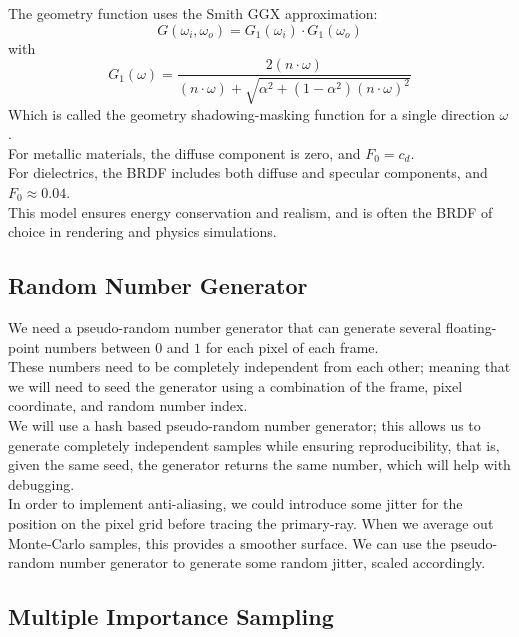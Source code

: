 \documentclass[12pt]{article}
\begin{document}
The geometry function uses the Smith GGX approximation:
\[ G(\omega_i, \omega_o) = 
G_1(\omega_i) \cdot G_1(\omega_o) \]
with
\[ G_1(\omega) = \frac{2 (n \cdot \omega)}
{(n \cdot \omega) + \sqrt{\alpha^2 + (1 - \alpha^2)
(n \cdot \omega)^2}} \]
Which is called the geometry shadowing-masking 
function for a single direction $\omega$. \\

For metallic materials, 
the diffuse component is zero, and 
$F_0 = c_d$. \\ 
For dielectrics, the BRDF includes both 
diffuse and specular components, 
and $F_0 \approx 0.04$. \\

This model ensures energy conservation and 
realism, and is often the BRDF of choice
in rendering and physics simulations. \\

\newpage

\subsection*{Random Number Generator}

We need a pseudo-random number generator that
can generate several 
floating-point numbers between $0$
and $1$ for each pixel of each frame. \\

These numbers need to be completely independent
from each other; meaning that we will need to
seed the generator using a combination of the frame,
pixel coordinate, and random number index. \\

We will use a hash based pseudo-random number
generator; this allows us to generate completely
independent samples while ensuring reproducibility,
that is, given the same seed, the generator returns
the same number, which will help with debugging. \\

In order to implement anti-aliasing, we could introduce
some jitter for the position on the pixel grid before
tracing the primary-ray. When we average out Monte-Carlo
samples, this provides a smoother surface.
We can use the pseudo-random number generator
to generate some random jitter, scaled accordingly. \\

\newpage

\subsection*{Multiple Importance Sampling}
\end{document}
